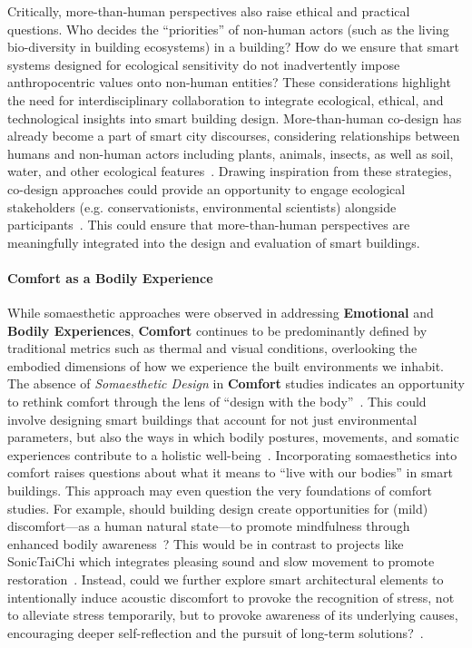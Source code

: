 Critically, more-than-human perspectives also raise ethical and practical questions. Who decides the ``priorities'' of non-human actors (such as the living bio-diversity in building ecosystems) in a building? How do we ensure that smart systems designed for ecological sensitivity do not inadvertently impose anthropocentric values onto non-human entities?  These considerations highlight the need for interdisciplinary collaboration to integrate ecological, ethical, and technological insights into smart building design. More-than-human co-design has already become a part of smart city discourses, considering relationships between humans and non-human actors including plants, animals, insects, as well as soil, water, and other ecological features~\cite{heitlinger2024designing, fieuw2022towards}. Drawing inspiration from these strategies, co-design approaches could provide an opportunity to engage ecological stakeholders (e.g. conservationists, environmental scientists) alongside participants~\cite{heitlinger2024designing}. This could ensure that more-than-human perspectives are meaningfully integrated into the design and evaluation of smart buildings.



\paragraph{Comfort as a Bodily Experience}
While somaesthetic approaches were observed in addressing \textbf{Emotional} and \textbf{Bodily Experiences}, \textbf{Comfort} continues to be predominantly defined by traditional metrics such as thermal and visual conditions, overlooking the embodied dimensions of how we experience the built environments we inhabit. The absence of \textit{Somaesthetic Design} in \textbf{Comfort} studies indicates an opportunity to rethink comfort through the lens of ``design with the body''~\cite{hook2018designing}. This could involve designing smart buildings that account for not just environmental parameters, but also the ways in which bodily postures, movements, and somatic experiences contribute to a holistic well-being~\cite{chappells2005debating}. Incorporating somaesthetics into comfort raises questions about what it means to ``live with our bodies'' in smart buildings. This approach may even question the very foundations of comfort studies. For example, should building design create opportunities for (mild) discomfort---as a human natural state---to promote mindfulness through enhanced bodily awareness~\cite{tschaepe2021somaesthetics}? This would be in contrast to projects like SonicTaiChi which integrates pleasing sound and slow movement to promote restoration~\cite{jakovich2007particletecture}. Instead, could we further explore smart architectural elements to intentionally induce acoustic discomfort to provoke the recognition of stress, not to alleviate stress temporarily, but to provoke awareness of its underlying causes, encouraging deeper self-reflection and the pursuit of long-term solutions?~\cite{tschaepe2021somaesthetics}.




